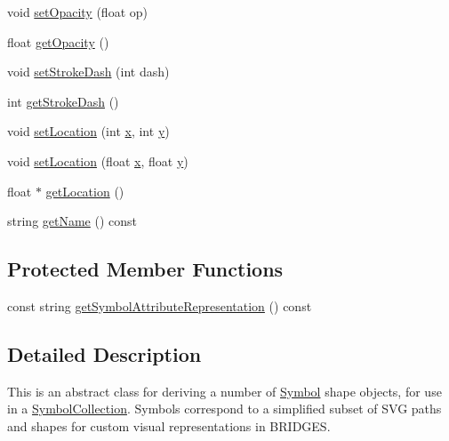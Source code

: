 \begin{DoxyCompactItemize}
\item 
void \mbox{\hyperlink{classbridges_1_1_symbol_a586939c47e544093cbd8f443bed8dfee}{set\+Opacity}} (float op)
\item 
float \mbox{\hyperlink{classbridges_1_1_symbol_abeda0c1f43346b91f028d2df80e270dc}{get\+Opacity}} ()
\item 
void \mbox{\hyperlink{classbridges_1_1_symbol_ab74d4afc6805db5be7613a82c7295c61}{set\+Stroke\+Dash}} (int dash)
\item 
int \mbox{\hyperlink{classbridges_1_1_symbol_aebd8935bc4f963a04412aa544beee27b}{get\+Stroke\+Dash}} ()
\item 
void \mbox{\hyperlink{classbridges_1_1_symbol_a9a1bdebb8dcec2871243a269e618a351}{set\+Location}} (int \mbox{\hyperlink{namespacebridges_acfb0a4f7877d8f63de3e6862004c50eda9dd4e461268c8034f5c8564e155c67a6}{x}}, int \mbox{\hyperlink{namespacebridges_acfb0a4f7877d8f63de3e6862004c50eda415290769594460e2e485922904f345d}{y}})
\item 
void \mbox{\hyperlink{classbridges_1_1_symbol_a5f774c3cbd407bc74d43e8d27bb6933f}{set\+Location}} (float \mbox{\hyperlink{namespacebridges_acfb0a4f7877d8f63de3e6862004c50eda9dd4e461268c8034f5c8564e155c67a6}{x}}, float \mbox{\hyperlink{namespacebridges_acfb0a4f7877d8f63de3e6862004c50eda415290769594460e2e485922904f345d}{y}})
\item 
float $\ast$ \mbox{\hyperlink{classbridges_1_1_symbol_a97f8b30d76dd0d8dd49167628bb3f810}{get\+Location}} ()
\item 
string \mbox{\hyperlink{classbridges_1_1_symbol_a798c3871fe791a841ab0e558807e5c6b}{get\+Name}} () const
\end{DoxyCompactItemize}
\subsection*{Protected Member Functions}
\begin{DoxyCompactItemize}
\item 
const string \mbox{\hyperlink{classbridges_1_1_symbol_a7818993a154ee736fe3d3ed65ce7d76e}{get\+Symbol\+Attribute\+Representation}} () const
\end{DoxyCompactItemize}


\subsection{Detailed Description}
This is an abstract class for deriving a number of \mbox{\hyperlink{classbridges_1_1_symbol}{Symbol}} shape objects, for use in a \mbox{\hyperlink{classbridges_1_1_symbol_collection}{Symbol\+Collection}}. Symbols correspond to a simplified subset of S\+VG paths and shapes for custom visual representations in B\+R\+I\+D\+G\+ES. 

